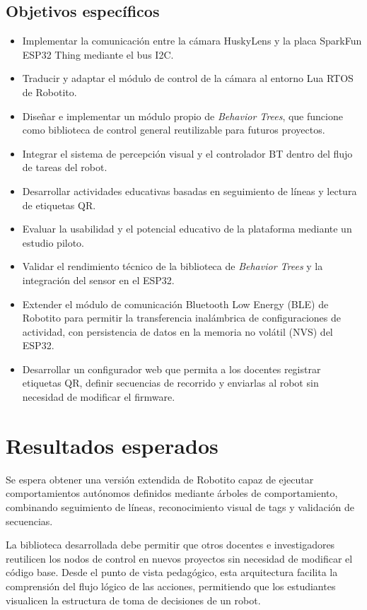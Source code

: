 \documentclass{prgrado}
\begin{document}
\subsection*{Objetivos específicos}
\begin{itemize}
    \item Implementar la comunicación entre la cámara HuskyLens y la placa SparkFun ESP32 Thing mediante el bus I2C.
    \item Traducir y adaptar el módulo de control de la cámara al entorno Lua RTOS de Robotito.
    \item Diseñar e implementar un módulo propio de \textit{Behavior Trees}, que funcione como biblioteca de control general reutilizable para futuros proyectos.
    \item Integrar el sistema de percepción visual y el controlador BT dentro del flujo de tareas del robot.
    \item Desarrollar actividades educativas basadas en seguimiento de líneas y lectura de etiquetas QR.
    \item Evaluar la usabilidad y el potencial educativo de la plataforma mediante un estudio piloto.
    \item Validar el rendimiento técnico de la biblioteca de \textit{Behavior Trees} y la integración del sensor en el ESP32.
    \item Extender el módulo de comunicación Bluetooth Low Energy (BLE) de Robotito para permitir la transferencia inalámbrica de configuraciones de actividad, con persistencia de datos en la memoria no volátil (NVS) del ESP32.
    \item Desarrollar un configurador web que permita a los docentes registrar etiquetas QR, definir secuencias de recorrido y enviarlas al robot sin necesidad de modificar el firmware.
\end{itemize}

\section{Resultados esperados}
Se espera obtener una versión extendida de Robotito capaz de ejecutar comportamientos autónomos definidos mediante árboles de comportamiento, combinando seguimiento de líneas, reconocimiento visual de tags y validación de secuencias.

La biblioteca desarrollada debe permitir que otros docentes e investigadores reutilicen los nodos de control en nuevos proyectos sin necesidad de modificar el código base. Desde el punto de vista pedagógico, esta arquitectura facilita la comprensión del flujo lógico de las acciones, permitiendo que los estudiantes visualicen la estructura de toma de decisiones de un robot.
\end{document}
